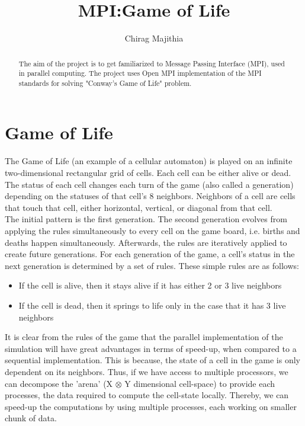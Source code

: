 \documentclass[a4paper, 10pt, conference]{IEEEtran}      %
\title{\LARGE \bf MPI:Game of Life}
\author{Chirag Majithia}
\begin{document}
	
	
	\maketitle
	\thispagestyle{empty}
	\pagestyle{empty}
	
	
	
	\begin{abstract}
		The aim of the project is to get familiarized to Message Passing Interface (MPI), used in parallel computing. The project uses Open MPI implementation of the MPI standards for solving "Conway's Game of Life" problem.
		
	\end{abstract}
	
	
	
	\section{Game of Life}
	The Game of Life (an example of a cellular automaton) is played on an infinite two-dimensional rectangular grid of cells. Each cell can be either alive or dead. The status of each cell changes each turn of the game (also called a generation) depending on the statuses of that cell's 8 neighbors. Neighbors of a cell are cells that touch that cell, either horizontal, vertical, or diagonal from that cell.\\
	
	The initial pattern is the first generation. The second generation evolves from applying the rules simultaneously to every cell on the game board, i.e. births and deaths happen simultaneously. Afterwards, the rules are iteratively applied to create future generations. For each generation of the game, a cell's status in the next generation is determined by a set of rules. These simple rules are as follows:\\
	\begin{itemize}
		\item 	If the cell is alive, then it stays alive if it has either 2 or 3 live neighbors
		\item 	If the cell is dead, then it springs to life only in the case that it has 3 live neighbors\\
	\end{itemize}
	
	It is clear from the rules of the game that the parallel implementation of the simulation will have great advantages in terms of speed-up, when compared to a sequential implementation. This is because, the state of a cell in the game is only dependent on its neighbors. Thus, if we have access to multiple processors, we can decompose the 'arena' (X $\otimes$ Y dimensional cell-space) to provide each processes, the data required to compute the cell-state locally. Thereby, we can speed-up the computations by using multiple processes, each working on smaller chunk of data.\\
	
\end{document}
